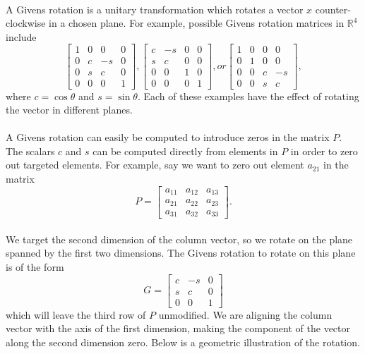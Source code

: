 \documentclass{article}
\begin{document}
\paragraph{}
A Givens rotation is a unitary transformation which rotates a vector $x$ counter-clockwise in a chosen plane. For example, possible Givens rotation matrices in $\mathbb{R}^4$ include
\begin{equation}
\begin{bmatrix}
1 & 0 & 0 & 0\\
0 & c & -s & 0\\
0 & s & c & 0\\
0 & 0 & 0 & 1
\end{bmatrix},
\begin{bmatrix}
c & -s & 0 & 0\\
s & c & 0 & 0\\
0 & 0 & 1 & 0\\
0 & 0 & 0 & 1
\end{bmatrix}, or
\begin{bmatrix}
1 & 0 & 0 & 0\\
0 & 1 & 0 & 0\\
0 & 0 & c & -s\\
0 & 0 & s & c
\end{bmatrix},
\end{equation}
where $c = \cos{\theta}$ and $s = \sin{\theta}$. Each of these examples have the effect of rotating the vector in different planes.

\paragraph{}
A Givens rotation can easily be computed to introduce zeros in the matrix $P$. The scalars $c$ and $s$ 
can be computed directly from elements in $P$ in order to zero out targeted elements. For 
example, say we want to zero out element $a_{21}$ in the matrix
\begin{equation}
P = 
\begin{bmatrix}
a_{11} & a_{12} & a_{13}\\
a_{21} & a_{22} & a_{23}\\
a_{31} & a_{32} & a_{33}
\end{bmatrix}.
\end{equation}
\paragraph{}
We target the second dimension of the column vector, so we rotate on the plane spanned by 
the first two dimensions. The Givens rotation to rotate 
on this plane is of the form
\begin{equation}
G = 
\begin{bmatrix}
c & -s & 0\\
s & c & 0\\
0 & 0 & 1
\end{bmatrix}
\end{equation}
which will leave the third row of $P$ unmodified. We are aligning the column vector with the axis of the first 
dimension, making the component of the vector along the second dimension zero. Below is a geometric 
illustration of the rotation.
\end{document}

